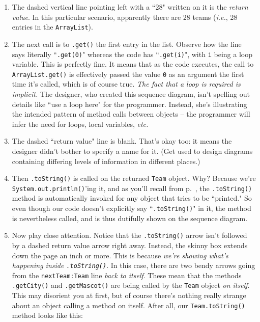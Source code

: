 \begin{enumerate}
\itemsep.1em

\item The dashed vertical line pointing left with a ``28" written on it is the
\textit{return value}. In this particular scenario, apparently there are 28
teams (\textit{i.e.}, 28 entries in the \texttt{ArrayList}).

\item The next call is to \texttt{.get()} the first entry in the list. Observe
how the line says literally ``\texttt{.get(0)}" whereas the code has
``\texttt{.get(i)}", with \texttt{i} being a loop variable. This is perfectly
fine. It means that as the code executes, the call to \texttt{ArrayList.get()}
is effectively passed the value \texttt{0} as an argument the first time it's
called, which is of course true. \textit{The fact that a loop is required is
implicit.} The designer, who created this sequence diagram, isn't spelling out
details like ``use a loop here" for the programmer. Instead, she's
illustrating the intended pattern of method calls between objects -- the
programmer will infer the need for loops, local variables, \textit{etc.}

\item The dashed ``return value" line is blank. That's okay too: it means the
designer didn't bother to specify a name for it. (Get used to design diagrams
containing differing levels of information in different places.)

\item Then \texttt{.toString()} is called on the returned \texttt{Team}
object. Why? Because we're \texttt{System.out.println()}'ing it, and as you'll
recall from p.~\pageref{pg:toString}, the \texttt{.toString()} method is
automatically invoked for any object that tries to be ``printed." So even
though our code doesn't explicitly say ``\texttt{.toString()}" in it, the
method is nevertheless called, and is thus dutifully shown on the sequence
diagram.

\item Now play close attention. Notice that the \texttt{.toString()} arrow
isn't followed by a dashed return value arrow right away. Instead, the skinny
box extends down the page an inch or more. This is because \textit{we're
showing what's happening inside \texttt{.toString()}}. In this case, there are
two bendy arrows going from the \texttt{nextTeam:Team} line \textit{back to
itself}. These mean that the methods \texttt{.getCity()} and
\texttt{.getMascot()} are being called by the \texttt{Team} object \textit{on
itself}. This may disorient you at first, but of course there's nothing really
strange about an object calling a method on itself. After all, our
\texttt{Team.toString()} method looks like this:


\end{enumerate}
